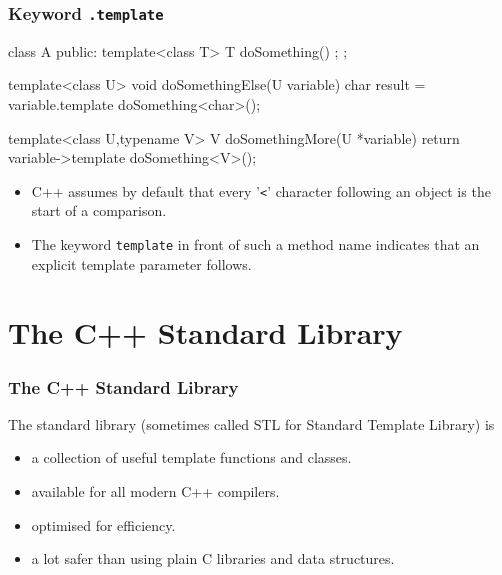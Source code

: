 \documentclass[aspectratio=169,ignorenonframetext,11pt]{beamer}
\def\inline{\lstinline[basicstyle=\small\ttfamily]}
\begin{document}

\begin{frame}[fragile,t]
\frametitle{Keyword \texttt{.template}}
\vspace*{-1em}
\begin{cppcode}
class A
{
  public:
    template<class T> T doSomething() { };
};

template<class U> void doSomethingElse(U variable)
{
    char result = variable.template doSomething<char>();
}

template<class U,typename V> V doSomethingMore(U *variable)
{
    return variable->template doSomething<V>();
}
\end{cppcode}
\begin{itemize}%
\item C++ assumes by default that every '\inline!<!' character following an object is the start of a comparison.
\item The keyword \inline!template! in front of such a method name indicates that
an explicit template parameter follows.
\end{itemize}

\end{frame}



\section{The C++ Standard Library}


\begin{frame}
\frametitle<presentation>{The C++ Standard Library}
The standard library (sometimes called STL for Standard Template Library) is
\begin{itemize}%
\item a collection of useful template functions and classes.
\item available for all modern C++ compilers.
\item optimised for efficiency.
\item a lot safer than using plain C libraries and data structures.
\end{itemize}
\end{frame}

\end{document}
